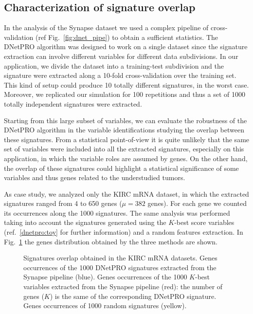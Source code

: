 \documentclass{standalone}
\begin{document}
\subsection[Signature Overlap]{Characterization of signature overlap}\label{synapse:overlap}

In the analysis of the Synapse dataset we used a complex pipeline of cross-validation (ref Fig.~\ref{fig:dnet_pipe}) to obtain a sufficient statistics.
The \textsf{DNetPRO} algorithm was designed to work on a single dataset since the signature extraction can involve different variables for different data subdivisions.
In our application, we divide the dataset into a training-test subdivision and the signature were extracted along a 10-fold cross-validation over the training set.
This kind of setup could produce 10 totally different signatures, in the worst case.
Moreover, we replicated our simulation for 100 repetitions and thus a set of 1000 totally independent signatures were extracted.

Starting from this large subset of variables, we can evaluate the robustness of the \textsf{DNetPRO} algorithm in the variable identifications studying the overlap between these signatures.
From a statistical point-of-view it is quite unlikely that the same set of variables were included into all the extracted signatures, especially on this application, in which the variable roles are assumed by genes.
On the other hand, the overlap of these signatures could highlight a statistical significance of some variables and thus genes related to the understudied tumors.

As case study, we analyzed only the KIRC mRNA dataset, in which the extracted signatures ranged from 4 to 650 genes ($\mu=382$ genes).
For each gene we counted its occurrences along the 1000 signatures.
The same analysis was performed taking into account the signatures generated using the $K$-best score variables (ref.~\ref{dnetpro:toy} for further information) and a random features extraction.
In Fig.~\ref{fig:overlap} the genes distribution obtained by the three methods are shown.

\begin{figure}[htbp]
\centering
\def\svgwidth{0.6\textwidth}

\caption{Signatures overlap obtained in the KIRC mRNA datasets.
Genes occurrences of the 1000 \textsf{DNetPRO} signatures extracted from the Synapse pipeline (blue).
Genes occurrences of the 1000 $K$-best variables extracted from the Synapse pipeline (red): the number of genes ($K$) is the same of the corresponding \textsf{DNetPRO} signature.
Genes occurrences of 1000 random signatures (yellow).
}
\label{fig:overlap}
\end{figure}
\end{document}
